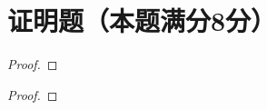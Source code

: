 \documentclass{CWNUExam}
\begin{document}
\begin{problem}

\end{problem}

\begin{solution}

\end{solution}

\begin{problem}

\end{problem}

\begin{solution}

\end{solution}

\begin{problem}

\end{problem}

\begin{solution}

\end{solution}

\section{证明题（本题满分8分）}

\begin{problem}

\end{problem}

\begin{proof}

\end{proof}

\begin{problem}

\end{problem}

\begin{proof}

\end{proof}
\end{document}
